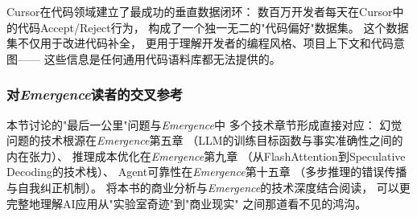 Cursor在代码领域建立了最成功的垂直数据闭环：
数百万开发者每天在Cursor中的代码Accept/Reject行为，
构成了一个独一无二的"代码偏好"数据集。
这个数据集不仅用于改进代码补全，
更用于理解开发者的编程风格、项目上下文和代码意图——
这些信息是任何通用代码语料库都无法提供的。

\subsubsection{对\textit{Emergence}读者的交叉参考}
本节讨论的"最后一公里"问题与\textit{Emergence}中
多个技术章节形成直接对应：
幻觉问题的技术根源在\textit{Emergence}第五章
（LLM的训练目标函数与事实准确性之间的内在张力）、
推理成本优化在\textit{Emergence}第九章
（从FlashAttention到Speculative Decoding的技术栈）、
Agent可靠性在\textit{Emergence}第十五章
（多步推理的错误传播与自我纠正机制）。
将本书的商业分析与\textit{Emergence}的技术深度结合阅读，
可以更完整地理解AI应用从"实验室奇迹"到"商业现实"
之间那道看不见的鸿沟。


\bigskip


